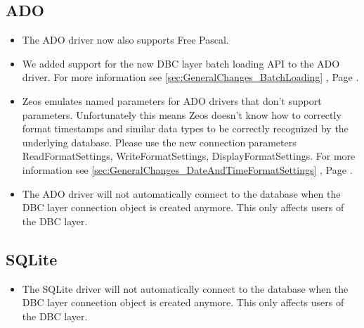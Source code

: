 \documentclass[a4paper,12pt,oneside]{article}
\begin{document}
\subsection{ADO}
\label{sec:DriverSpecificChanges_Ado}
\begin{itemize}
\item
  The ADO driver now also supports Free Pascal.
\item
  We added support for the new DBC layer batch loading API to the ADO driver.
	For more information see \ref{sec:GeneralChanges_BatchLoading} , Page \pageref{sec:GeneralChanges_BatchLoading}.
\item
  Zeos emulates named parameters for ADO drivers that don't support parameters.
	Unfortunately this means Zeos doesn't know how to correctly format timestamps and similar data types to be correctly recognized by the underlying database.
	Please use the new connection parameters ReadFormatSettings, WriteFormatSettings, DisplayFormatSettings.
	For more information see \ref{sec:GeneralChanges_DateAndTimeFormatSettings} , Page \pageref{sec:GeneralChanges_DateAndTimeFormatSettings}.
\item
  The ADO driver will not automatically connect to the database when the DBC layer connection object is created anymore.
	This only affects users of the DBC layer.	
\end{itemize}

\subsection{SQLite}
\begin{itemize}
\item
  The SQLite driver will not automatically connect to the database when the DBC layer connection object is created anymore.
	This only affects users of the DBC layer.
\end{itemize}
\end{document}

